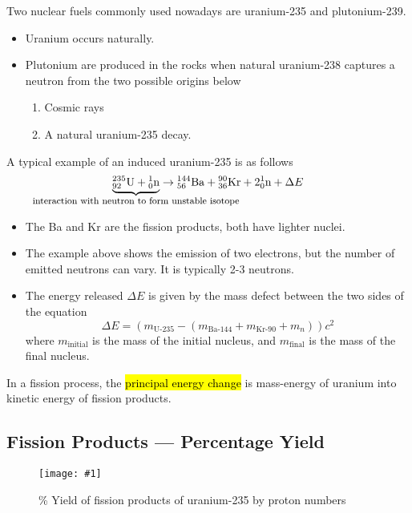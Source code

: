 \documentclass[a4paper,12pt]{article}
\newcommand{\img}[4]{\begin{center}
  \begin{figure}[H]
    \centering
    \texttt{[image: \#1]}
    \caption{#3}
    \label{fig:#4}
  \end{figure}
\end{center}}
\newcommand{\paren}[1]{\left(#1\right)}
\newcommand{\atom}[3]{{}^{#1}_{#2}\text{#3}}
\begin{document}
Two nuclear fuels commonly used nowadays are uranium-235 and plutonium-239.
\begin{itemize}
  \item Uranium occurs naturally.
  \item Plutonium are produced in the rocks when natural uranium-238 captures a neutron from the two possible origins below
        \begin{enumerate}
          \item Cosmic rays
          \item A natural uranium-235 decay.
        \end{enumerate}
\end{itemize}

A typical example of an induced uranium-235 is as follows
$$\underbrace{\atom{235}{92}{U} + \atom{1}{0}{n}}_\text{\makebox[0pt]{\footnotesize{interaction with neutron to form unstable isotope}}} \rightarrow \atom{144}{56}{Ba} + \atom{90}{36}{Kr} + 2\atom{1}{0}{n} + \Delta E$$
\begin{itemize}
  \item The Ba and Kr are the fission products, both have lighter nuclei.
  \item The example above shows the emission of two electrons, but the number of emitted neutrons can vary. It is typically 2-3 neutrons.
  \item The energy released $\Delta E$ is given by the mass defect between the two sides of the equation $$\Delta E = \paren{m_{\text{U-235}} - \paren{m_\text{Ba-144} + m_\text{Kr-90} + m_{n}}}c^2$$
        where $m_{\text{initial}}$ is the mass of the initial nucleus, and $m_{\text{final}}$ is the mass of the final nucleus.
\end{itemize}

In a fission process, the \hl{principal energy change} is mass-energy of uranium into kinetic energy of fission products.

\pagebreak

\subsection{Fission Products --- Percentage Yield}

\img{u235g.png}{0.5}{\% Yield of fission products of uranium-235 by proton numbers}{u235g}
\end{document}
